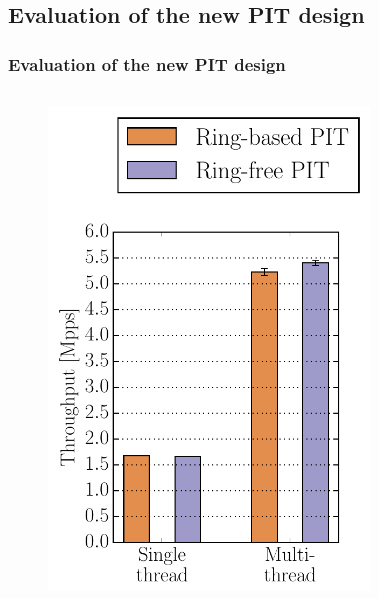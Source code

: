 \subsection{Evaluation of the new PIT design}
\begin{frame}[fragile]
  \frametitle{Evaluation of the new PIT design}

  \begin{columns}[c]
    \begin{figure}
      \includegraphics[width=\textwidth]{img/pit_thr_cmp.pdf}
    \end{figure}
    \begin{figure}

\end{figure}
\end{columns}
\end{frame}
